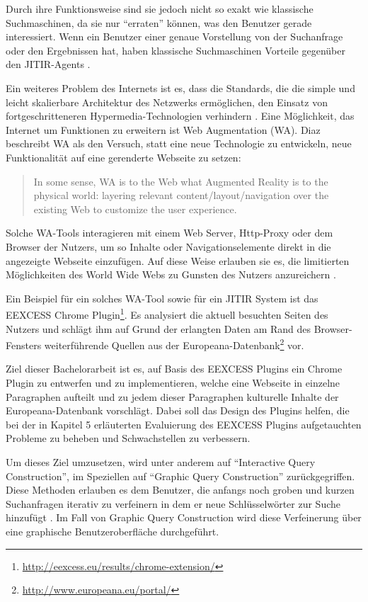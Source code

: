 Durch ihre Funktionsweise sind sie jedoch nicht so exakt wie klassische Suchmaschinen, da sie nur ``erraten'' können, was den Benutzer gerade interessiert. Wenn ein Benutzer einer genaue Vorstellung von der Suchanfrage oder den Ergebnissen hat, haben klassische Suchmaschinen Vorteile gegenüber den JITIR-Agents \cite{rhodes2000just}.

Ein weiteres Problem des Internets ist es, dass die Standards, die die simple und leicht skalierbare Architektur des Netzwerks ermöglichen, den Einsatz von fortgeschritteneren Hypermedia-Technologien verhindern \cite{bouvin1999unifying}. Eine Möglichkeit, das Internet um Funktionen zu erweitern ist Web Augmentation (WA). Diaz \cite{diaz2012understanding} beschreibt WA als den Versuch, statt eine neue Technologie zu entwickeln, neue Funktionalität auf eine gerenderte Webseite zu setzen:
\begin{quote}
In some sense, WA is to the Web what Augmented Reality is to the physical world: layering relevant content/layout/navigation over the existing Web to customize the user experience. \cite{diaz2012understanding}
\end{quote}
Solche WA-Tools interagieren mit einem Web Server, Http-Proxy oder dem Browser der Nutzers, um so Inhalte oder Navigationselemente direkt in die angezeigte Webseite einzufügen. Auf diese Weise erlauben sie es, die limitierten Möglichkeiten des World Wide Webs zu Gunsten des Nutzers anzureichern \cite{anderson1997integrating}.

Ein Beispiel für ein solches WA-Tool sowie für ein JITIR System ist das EEXCESS Chrome Plugin\footnote{\url{http://eexcess.eu/results/chrome-extension/}}. Es analysiert die aktuell besuchten Seiten des Nutzers und schlägt ihm auf Grund der erlangten Daten am Rand des Browser-Fensters weiterführende Quellen aus der Europeana-Datenbank\footnote{\url{http://www.europeana.eu/portal/}} vor.

Ziel dieser Bachelorarbeit ist es, auf Basis des EEXCESS Plugins ein Chrome Plugin zu entwerfen und zu implementieren, welche eine Webseite in einzelne Paragraphen aufteilt und zu jedem dieser Paragraphen kulturelle Inhalte der Europeana-Datenbank vorschlägt. Dabei soll das Design des Plugins helfen, die bei der in Kapitel 5 erläuterten Evaluierung des EEXCESS Plugins aufgetauchten Probleme zu beheben und Schwachstellen zu verbessern.

Um dieses Ziel umzusetzen, wird unter anderem auf ``Interactive Query Construction'', im Speziellen auf ``Graphic Query Construction'' zurückgegriffen. Diese Methoden erlauben es dem Benutzer, die anfangs noch groben und kurzen Suchanfragen iterativ zu verfeinern \cite{goldman1999interactive} in dem er neue Schlüsselwörter zur Suche hinzufügt \cite{ruthven2003re}. Im Fall von Graphic Query Construction wird diese Verfeinerung über eine graphische Benutzeroberfläche durchgeführt.

